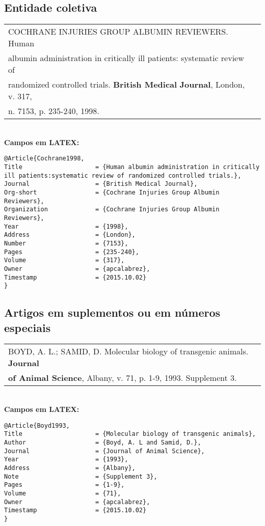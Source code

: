 \subsection{Entidade coletiva}

\begin{tabular}{|l|c|} \hline
COCHRANE INJURIES GROUP ALBUMIN REVIEWERS. Human \\albumin administration in critically ill patients: systematic review of \\randomized controlled trials. \textbf{British Medical} \textbf{Journal}, London, v. 317, \\n. 7153, p. 235-240, 1998. 
	\\\hline
\end{tabular} \\

\textbf{Campos em LATEX:} 

\begin{verbatim}
@Article{Cochrane1998,
Title                    = {Human albumin administration in critically 
ill patients:systematic review of randomized controlled trials.},
Journal                  = {British Medical Journal},
Org-short                = {Cochrane Injuries Group Albumin Reviewers},
Organization             = {Cochrane Injuries Group Albumin Reviewers},
Year                     = {1998},
Address                  = {London},
Number                   = {7153},
Pages                    = {235-240},
Volume                   = {317},
Owner                    = {apcalabrez},
Timestamp                = {2015.10.02}
}
\end{verbatim}

\subsection{Artigos em suplementos ou em números especiais}

\begin{tabular}{|l|c|} \hline
BOYD, A. L.; SAMID, D. Molecular biology of transgenic animals. \textbf{Journal } \\ \textbf{of Animal Science}, Albany, v. 71, p. 1-9, 1993. Supplement 3. 
	\\\hline
\end{tabular} \\

\textbf{Campos em LATEX:} 

\begin{verbatim}
@Article{Boyd1993,
Title                    = {Molecular biology of transgenic animals},
Author                   = {Boyd, A. L and Samid, D.},
Journal                  = {Journal of Animal Science},
Year                     = {1993},
Address                  = {Albany},
Note                     = {Supplement 3},
Pages                    = {1-9},
Volume                   = {71},
Owner                    = {apcalabrez},
Timestamp                = {2015.10.02}
}
\end{verbatim}

